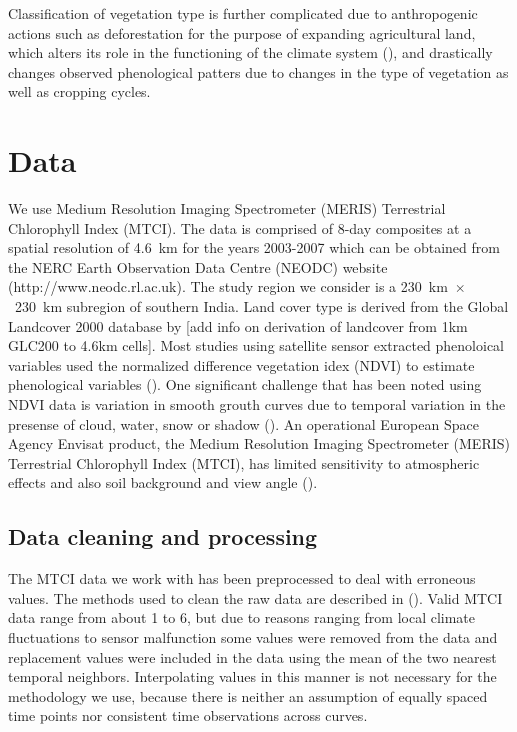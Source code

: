 Classification of vegetation type is further complicated due to anthropogenic actions such as deforestation for the purpose of expanding agricultural land, which alters its role in the functioning of the climate system (\cite{Shukla:1990wr}), and drastically changes observed phenological patters due to changes in the type of vegetation as well as cropping cycles. 

\section{Data} 

\label{sec:data} We use Medium Resolution Imaging Spectrometer (MERIS) Terrestrial Chlorophyll Index (MTCI). The data is comprised of 8-day composites at a spatial resolution of 4.6~km for the years 2003-2007 which can be obtained from the NERC Earth Observation Data Centre (NEODC) website (http://www.neodc.rl.ac.uk). The study region we consider is a 230~km~$\times$~230~km subregion of southern India. Land cover type is derived from the Global Landcover 2000 database by [add info on derivation of landcover from 1km GLC200 to 4.6km cells].  Most studies using satellite sensor extracted phenoloical variables used the normalized difference vegetation idex (NDVI) to estimate phenological variables (\cite{Jeyaseelan:2007dh,Saikia:2009cm}). One significant challenge that has been noted using NDVI data is variation in smooth grouth curves due to temporal variation in the presense of cloud, water, snow or shadow (\cite{Goward:1985hr,Huete:2002gy}). An operational European Space Agency Envisat product, the Medium Resolution Imaging Spectrometer (MERIS) Terrestrial Chlorophyll Index (MTCI), has limited sensitivity to atmospheric effects and also soil background and view angle (\cite{Dash:2010kva}). 

\subsection{Data cleaning and processing} %
\label{sub:data_cleaning_and_processing}

The MTCI data we work with has been preprocessed to deal with erroneous values. The methods used to clean the raw data are described in (\cite{Dash:2010kva}). Valid MTCI data range from about 1 to 6, but due to reasons ranging from local climate fluctuations to sensor malfunction some values were removed from the data and replacement values were included in the data using the mean of the two nearest temporal neighbors. Interpolating values in this manner is not necessary for the methodology we use, because there is neither an assumption of equally spaced time points nor consistent time observations across curves.

